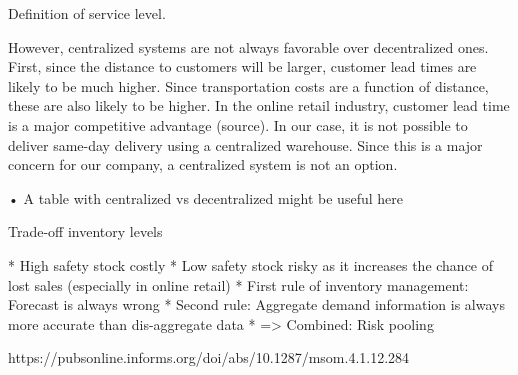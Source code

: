 \documentclass[../../main.tex]{subfiles}
\begin{document}
Definition of service level.

However, centralized systems are not always favorable over decentralized ones. First, since the distance to customers will be larger, customer lead times are likely to be much higher. Since transportation costs are a function of distance, these are also likely to be higher. In the online retail industry, customer lead time is a major competitive advantage (source). In our case, it is not possible to deliver same-day delivery using a centralized warehouse. Since this is a major concern for our company, a centralized system is not an option.

•	A table with centralized vs decentralized might be useful here

Trade-off inventory levels

*	High safety stock costly
*	Low safety stock risky as it increases the chance of lost sales (especially in online retail)
*	First rule of inventory management: Forecast is always wrong
*	Second rule: Aggregate demand information is always more accurate than dis-aggregate data
*	=> Combined: Risk pooling

https://pubsonline.informs.org/doi/abs/10.1287/msom.4.1.12.284

\end{document}
